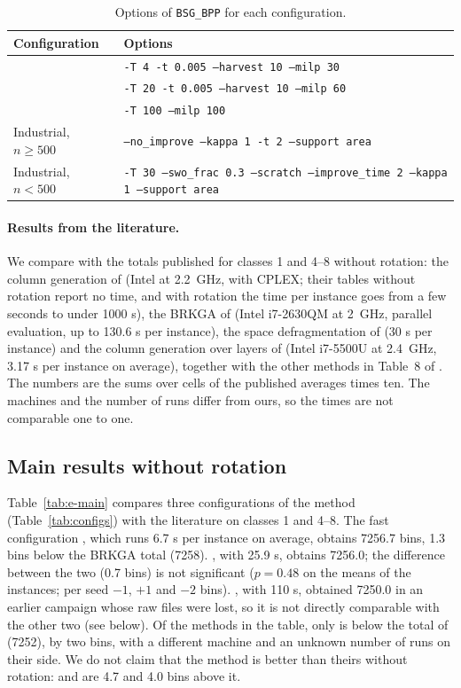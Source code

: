\begin{table}[t]
\centering
\small
\caption{Options of \texttt{BSG\_BPP} for each configuration.}
\label{tab:e-commands}
\begin{tabular}{@{}ll@{}}
\toprule
Configuration & Options\\
\midrule
\cfgfast{} & \texttt{-T 4 -t 0.005 --harvest 10 --milp 30}\\
\cfgbal{} & \texttt{-T 20 -t 0.005 --harvest 10 --milp 60}\\
\cfgqual{} & \texttt{-T 100 --milp 100}\\
Industrial, $n\ge 500$ & \texttt{--no\_improve --kappa 1 -t 2 --support area}\\
Industrial, $n<500$ & \texttt{-T 30 --swo\_frac 0.3 --scratch --improve\_time 2 --kappa 1 --support area}\\
\bottomrule
\end{tabular}
\end{table}

\paragraph{Results from the literature.}
We compare with the totals published for classes 1 and 4--8 without rotation: the column generation
of \citet{Mahvash2018} (Intel at 2.2~GHz, with CPLEX; their tables without rotation report no time, and
with rotation the time per instance goes from a few seconds to under 1000 s), the BRKGA of
\citet{Goncalves2013} (Intel i7-2630QM at 2~GHz, parallel evaluation, up to 130.6 s per instance), the space defragmentation of
\citet{Zhu2012SD} (30 s per instance) and the column generation over layers of \citet{Elhedhli2019}
(Intel i7-5500U at 2.4~GHz, 3.17 s per instance on average), together with the other methods in Table~8 of
\citet{Goncalves2013}. The numbers are the sums over cells of the published averages times ten. The machines
and the number of runs differ from ours, so the times are not comparable one to one.

\subsection{Main results without rotation}
\label{sec:e-mpv}

Table~\ref{tab:e-main} compares three configurations of the method (Table~\ref{tab:configs}) with the
literature on classes 1 and 4--8. The fast configuration \cfgfast{}, which runs 6.7 s per instance on
average, obtains 7256.7 bins, 1.3 bins below the BRKGA total (7258). \cfgbal{}, with 25.9 s, obtains 7256.0; the difference between the two
(0.7 bins) is not significant ($p=0.48$ on the means of the instances; per seed $-1$, $+1$ and $-2$ bins). \cfgqual{}, with 110 s, obtained 7250.0 in an earlier campaign
whose raw files were lost, so it is not directly comparable with the other two (see below). Of the methods in the table, only \cfgqual{} is below the
total of \citet{Mahvash2018} (7252), by two bins, with a different machine and an unknown number of runs on their side. We do not claim
that the method is better than theirs without rotation: \cfgfast{} and \cfgbal{} are 4.7 and 4.0 bins above it.

